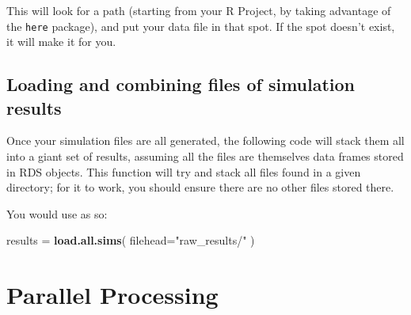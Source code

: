 \documentclass[
]{book}
\newenvironment{Shaded}{\begin{snugshade}}{\end{snugshade}}
\newcommand{\AttributeTok}[1]{\textcolor[rgb]{0.13,0.29,0.53}{#1}}
\newcommand{\ConstantTok}[1]{\textcolor[rgb]{0.56,0.35,0.01}{#1}}
\newcommand{\ControlFlowTok}[1]{\textcolor[rgb]{0.13,0.29,0.53}{\textbf{#1}}}
\newcommand{\FunctionTok}[1]{\textcolor[rgb]{0.13,0.29,0.53}{\textbf{#1}}}
\newcommand{\NormalTok}[1]{#1}
\newcommand{\OtherTok}[1]{\textcolor[rgb]{0.56,0.35,0.01}{#1}}
\newcommand{\SpecialCharTok}[1]{\textcolor[rgb]{0.81,0.36,0.00}{\textbf{#1}}}
\newcommand{\StringTok}[1]{\textcolor[rgb]{0.31,0.60,0.02}{#1}}
\begin{document}
This will look for a path (starting from your R Project, by taking advantage of the \texttt{here} package), and put your data file in that spot.
If the spot doesn't exist, it will make it for you.

\section{Loading and combining files of simulation results}\label{loading-and-combining-files-of-simulation-results}

Once your simulation files are all generated, the following code will stack them all into a giant set of results, assuming all the files are themselves data frames stored in RDS objects.
This function will try and stack all files found in a given directory; for it to work, you should ensure there are no other files stored there.

\begin{Shaded}
\end{Shaded}

You would use as so:

\begin{Shaded}
\begin{Highlighting}[]
\NormalTok{results }\OtherTok{=} \FunctionTok{load.all.sims}\NormalTok{( }\AttributeTok{filehead=}\StringTok{"raw\_results/"}\NormalTok{ )}
\end{Highlighting}
\end{Shaded}

\chapter{Parallel Processing}\label{parallel-processing}
\end{document}
